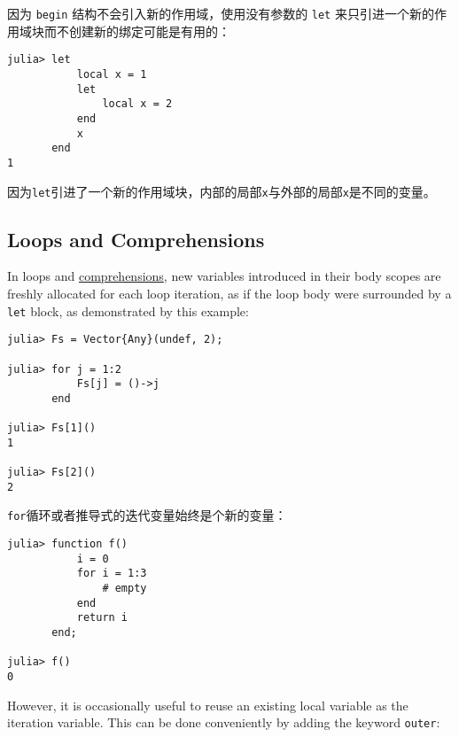 因为 \texttt{begin} 结构不会引入新的作用域，使用没有参数的 \texttt{let} 来只引进一个新的作用域块而不创建新的绑定可能是有用的：




\begin{verbatim}
julia> let
           local x = 1
           let
               local x = 2
           end
           x
       end
1
\end{verbatim}



因为\texttt{let}引进了一个新的作用域块，内部的局部\texttt{x}与外部的局部\texttt{x}是不同的变量。



\hypertarget{17142085918864004510}{}


\subsection{Loops and Comprehensions}



In loops and \hyperlink{3967134426571365188}{comprehensions}, new variables introduced in their body scopes are freshly allocated for each loop iteration, as if the loop body were surrounded by a \texttt{let} block, as demonstrated by this example:




\begin{verbatim}
julia> Fs = Vector{Any}(undef, 2);

julia> for j = 1:2
           Fs[j] = ()->j
       end

julia> Fs[1]()
1

julia> Fs[2]()
2
\end{verbatim}



\texttt{for}循环或者推导式的迭代变量始终是个新的变量：




\begin{lstlisting}
julia> function f()
           i = 0
           for i = 1:3
               # empty
           end
           return i
       end;

julia> f()
0
\end{lstlisting}



However, it is occasionally useful to reuse an existing local variable as the iteration variable. This can be done conveniently by adding the keyword \texttt{outer}:





